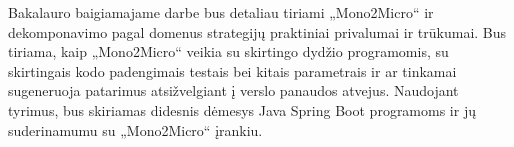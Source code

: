 \documentclass[fleqn]{VUMIFPSkursinis}
\begin{document}
Bakalauro baigiamajame darbe bus detaliau tiriami „Mono2Micro“ ir dekomponavimo pagal domenus strategijų praktiniai privalumai ir trūkumai. Bus tiriama, kaip „Mono2Micro“ veikia su skirtingo dydžio programomis, su skirtingais kodo padengimais testais bei kitais parametrais ir ar tinkamai sugeneruoja patarimus atsižvelgiant į verslo panaudos atvejus. Naudojant tyrimus, bus skiriamas didesnis dėmesys Java Spring Boot programoms ir jų suderinamumu su „Mono2Micro“ įrankiu.

\printbibliography  %
\end{document}
